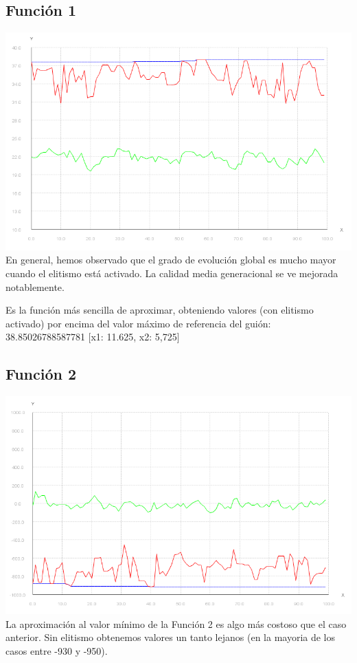 \documentclass{article}
\begin{document}
\subsection{Función 1}
\includegraphics[scale=0.5]{./images/graph1_bin.png}
En general, hemos observado que el grado de evolución global es mucho mayor cuando el elitismo está activado. La calidad media generacional se ve mejorada notablemente.

Es la función más sencilla de aproximar, obteniendo valores (con elitismo activado) por encima del valor máximo de referencia del guión: 38.85026788587781 [x1: 11.625, x2: 5,725]
\subsection{Función 2}
\includegraphics[scale=0.5]{./images/graph2_bin.png}
La aproximación al valor mínimo de la Función 2 es algo más costoso que el caso anterior. Sin elitismo obtenemos valores un tanto lejanos (en la mayoria de los casos entre -930 y -950). 
\end{document}
